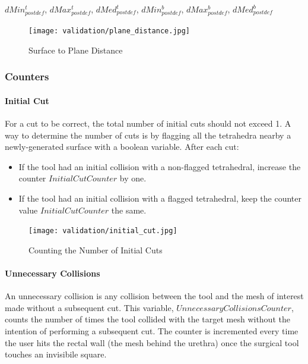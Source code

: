 \hfill

$dMin_{postdef}^t$, $dMax_{postdef}^t$, $dMed_{postdef}^t$, $dMin_{postdef}^b$, $dMax_{postdef}^b$, $dMed_{postdef}^b$

\begin{figure}
  \centering%
  \texttt{[image: validation/plane\_distance.jpg]}
  \caption{Surface to Plane Distance}\label{fig:surface_to_plane_distance}
\end{figure}

\subsubsection{Counters}\label{para:data_counters}

\paragraph{Initial Cut}\label{para:data_counters_initial_cut}

For a cut to be correct, the total number of initial cuts should not exceed 1. A way to determine the number of cuts is by flagging all the tetrahedra nearby a newly-generated surface with a boolean variable. After each cut:

\begin{itemize}
\item If the tool had an initial collision with a non-flagged tetrahedral, increase the counter $InitialCutCounter$ by one.
\item If the tool had an initial collision with a flagged tetrahedral, keep the counter value $InitialCutCounter$ the same.
\end{itemize}

\begin{figure}
  \centering%
  \texttt{[image: validation/initial\_cut.jpg]}
  \caption{Counting the Number of Initial Cuts}
  \label{fig:ideal_cut}
\end{figure}


\paragraph{Unnecessary Collisions}
\label{para:data_counters_unnecessary_collisions}

An unnecessary collision is any collision between the tool and the mesh of interest made without a subsequent cut. This variable, $UnnecessaryCollisionsCounter$, counts the number of times the tool collided with the target mesh without the intention of performing a subsequent cut. The counter is incremented every time the user hits the rectal wall (the mesh behind the urethra) once the surgical tool touches an invisibile square.

